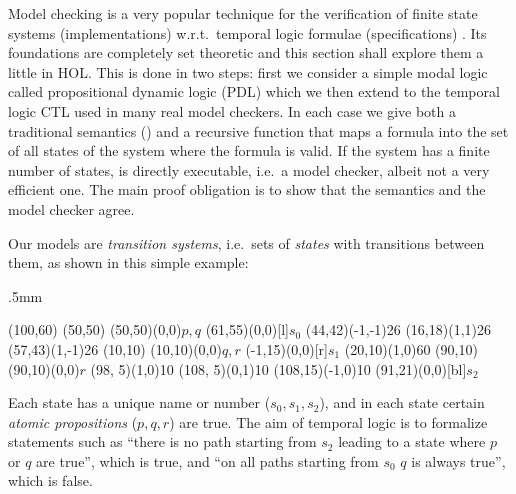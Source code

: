 %
\begin{isabellebody}%
\def\isabellecontext{Base}%
%
%
\begin{isamarkuptext}%
\label{sec:VMC}
Model checking is a very popular technique for the verification of finite
state systems (implementations) w.r.t.\ temporal logic formulae
(specifications) \cite{ClarkeGP-book,Huth-Ryan-book}. Its foundations are completely set theoretic
and this section shall explore them a little in HOL. This is done in two steps: first
we consider a simple modal logic called propositional dynamic
logic (PDL) which we then extend to the temporal logic CTL used in many real
model checkers. In each case we give both a traditional semantics (\isa{{\isasymTurnstile}}) and a
recursive function  that maps a formula into the set of all states of
the system where the formula is valid. If the system has a finite number of
states,  is directly executable, i.e.\ a model checker, albeit not a
very efficient one. The main proof obligation is to show that the semantics
and the model checker agree.

\underscoreon

Our models are \emph{transition systems}, i.e.\ sets of \emph{states} with
transitions between them, as shown in this simple example:
\begin{center}
\unitlength.5mm
\thicklines
\begin{picture}(100,60)
\put(50,50){}
\put(50,50){\makebox(0,0){$p,q$}}
\put(61,55){\makebox(0,0)[l]{$s_0$}}
\put(44,42){\vector(-1,-1){26}}
\put(16,18){\vector(1,1){26}}
\put(57,43){\vector(1,-1){26}}
\put(10,10){}
\put(10,10){\makebox(0,0){$q,r$}}
\put(-1,15){\makebox(0,0)[r]{$s_1$}}
\put(20,10){\vector(1,0){60}}
\put(90,10){}
\put(90,10){\makebox(0,0){$r$}}
\put(98, 5){\line(1,0){10}}
\put(108, 5){\line(0,1){10}}
\put(108,15){\vector(-1,0){10}}
\put(91,21){\makebox(0,0)[bl]{$s_2$}}
\end{picture}
\end{center}
Each state has a unique name or number ($s_0,s_1,s_2$), and in each
state certain \emph{atomic propositions} ($p,q,r$) are true.
The aim of temporal logic is to formalize statements such as ``there is no
path starting from $s_2$ leading to a state where $p$ or $q$
are true'', which is true, and ``on all paths starting from $s_0$ $q$ is always true'',
which is false.


\end{isamarkuptext}
\end{isabellebody}
